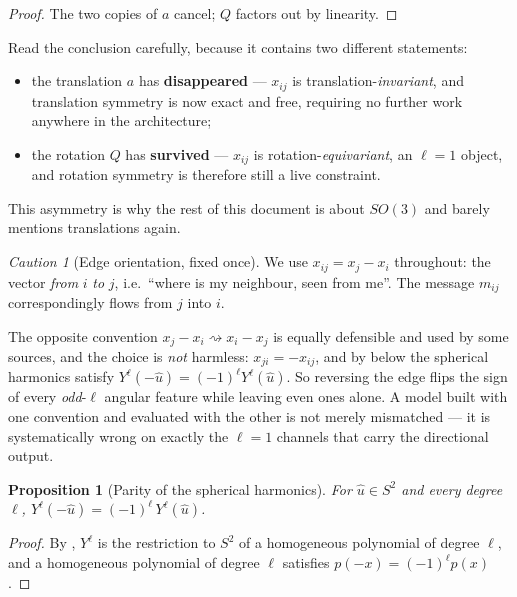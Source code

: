 \documentclass[11pt,a4paper]{report}
\newtheorem{proposition}[proposition]{Proposition}
\theoremstyle{definition}
\theoremstyle{remark}
\newtheorem{caution}[caution]{Caution}
\begin{document}
\begin{proof}
The two copies of $a$ cancel; $Q$ factors out by linearity.
\end{proof}

Read the conclusion carefully, because it contains two different statements:
\begin{itemize}[nosep]
\item the translation $a$ has \textbf{disappeared} --- $x_{ij}$ is
translation-\emph{invariant}, and translation symmetry is now exact and free,
requiring no further work anywhere in the architecture;
\item the rotation $Q$ has \textbf{survived} --- $x_{ij}$ is
rotation-\emph{equivariant}, an $\ell=1$ object, and rotation symmetry is
therefore still a live constraint.
\end{itemize}
This asymmetry is why the rest of this document is about $SO(3)$ and barely
mentions translations again.

\begin{caution}[Edge orientation, fixed once]
\label{caution:edge-orientation}
We use $x_{ij}=x_j-x_i$ throughout: the vector \emph{from} $i$ \emph{to}
$j$, i.e.\ ``where is my neighbour, seen from me''. The message
$m_{ij}$ correspondingly flows from $j$ into $i$.

The opposite convention $x_j-x_i\rightsquigarrow x_i-x_j$ is equally
defensible and used by some sources, and the choice is \emph{not} harmless:
$x_{ji}=-x_{ij}$, and by  below the spherical
harmonics satisfy $Y^\ell(-\hat u)=(-1)^\ell Y^\ell(\hat u)$. So reversing
the edge flips the sign of every \emph{odd}-$\ell$ angular feature while
leaving even ones alone. A model built with one convention and evaluated
with the other is not merely mismatched --- it is systematically wrong on
exactly the $\ell=1$ channels that carry the directional output.
\end{caution}

\begin{proposition}[Parity of the spherical harmonics]
\label{prop:sph-parity}
For $\hat u\in S^2$ and every degree $\ell$,
$Y^\ell(-\hat u)=(-1)^\ell\,Y^\ell(\hat u)$.
\end{proposition}

\begin{proof}
By , $Y^\ell$ is the restriction to
$S^2$ of a homogeneous polynomial of degree $\ell$, and a homogeneous
polynomial of degree $\ell$ satisfies $p(-x)=(-1)^\ell p(x)$.
\end{proof}
\end{document}
